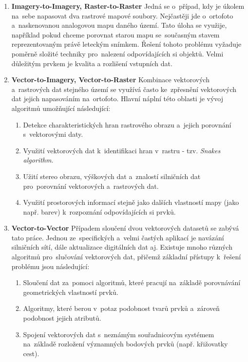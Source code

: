 \begin{enumerate}
  \item \textbf{Imagery-to-Imagery, Raster-to-Raster}
    \subitem Jedná se o~případ, kdy je úkolem na~sebe napasovat dva rastrové mapové soubory. Nejčastěji jde o~ortofoto a~naskenovanou analogovou mapu daného území. Tato úloha
	      se využije, například pokud chceme porovnat starou mapu se~současným stavem reprezentovaným právě leteckým snímkem. Řešení tohoto problému vyžaduje poměrně 
	      složité techniky pro~nalezení odpovídajících si objektů. Velmi důležitým prvkem je kvalita a rozlišení vstupních dat.
  \item \textbf{Vector-to-Imagery, Vector-to-Raster}
    \subitem Kombinace vektorových a~rastrových dat stejného území se využívá často ke~zpřesnění vektorových dat jejich napasováním na~ortofoto. Hlavní náplní této oblasti
	      je vývoj algoritmů umožňující následující: %
	      \begin{enumerate}
	       \item Detekce charakteristických hran rastrového obrazu a~jejich porovnání s~vektorovými daty.
	       \item Využití vektorových dat k~identifikaci hran v~rastru - tzv. \textit{Snakes algorithm}.
	       \item Užití stereo obrazu, výškových dat a~znalostí silničních dat pro~porovnání vektorových a~rastrových dat. %
	       \item Využití prostorových informací stejně jako dalších vlastností mapy (jako např. barev) k~rozpoznání odpovídajících si prvků.
	      \end{enumerate}
  \item \textbf{Vector-to-Vector}
    \subitem Případem sloučení dvou vektorových datasetů se zabývá tato práce. Jednou ze~specifických a~velmi častých aplikací je navázání silničních sítí, dále aktualizace
	      digitálních dat aj. Existuje mnoho různých algoritmů pro~slučování vektorových dat, přičemž základní přístupy k~řešení problému jsou následující: %
	      \begin{enumerate}
	       \item Sloučení dat za~pomoci algoritmů, které pracují na~základě porovnávání geometrických vlastností prvků.
	       \item Algoritmy, které berou v~potaz podobnost tvarů prvků a~zároveň podobnost jejich atributů.
	       \item Spojení vektorových dat s~neznámým souřadnicovým systémem na~základě rozložení významných bodových prvků (např. křižovatky cest).
	      \end{enumerate}

\end{enumerate}


